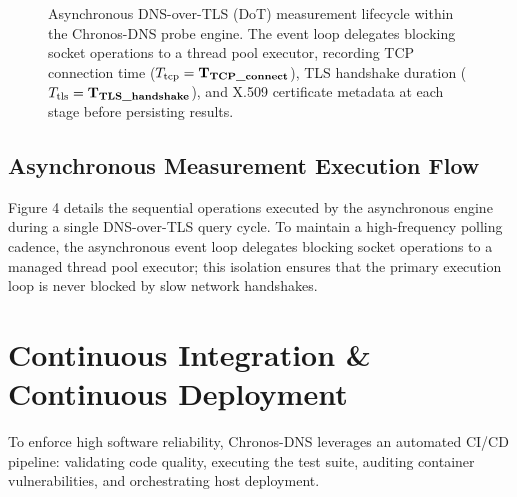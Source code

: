 \documentclass[10pt,journal,compsoc]{IEEEtran}
\begin{document}
\begin{figure}[!t]
\caption{Asynchronous DNS-over-TLS (DoT) measurement lifecycle within the Chronos-DNS probe engine. The event loop delegates blocking socket operations to a thread pool executor, recording TCP connection time ($T_{\text{tcp}} = \mathbf{T_{\text{\textbf{TCP\_connect}}}}$), TLS handshake duration ($T_{\text{tls}} = \mathbf{T_{\text{\textbf{TLS\_handshake}}}}$), and X.509 certificate metadata at each stage before persisting results.}
\end{figure}

\subsection{Asynchronous Measurement Execution Flow}
Figure 4 details the sequential operations executed by the asynchronous engine during a single DNS-over-TLS query cycle. To maintain a high-frequency polling cadence, the asynchronous event loop delegates blocking socket operations to a managed thread pool executor; this isolation ensures that the primary execution loop is never blocked by slow network handshakes.

\section{Continuous Integration \& Continuous Deployment}
To enforce high software reliability, Chronos-DNS leverages an automated CI/CD pipeline: validating code quality, executing the test suite, auditing container vulnerabilities, and orchestrating host deployment.
\end{document}
